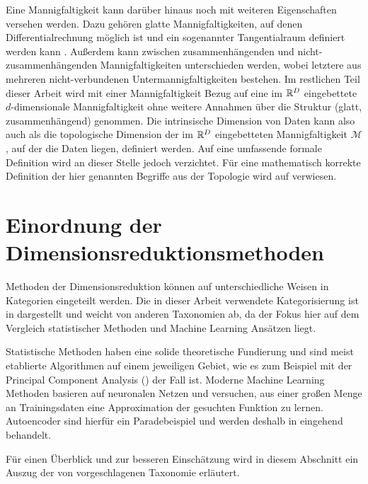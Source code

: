Eine Mannigfaltigkeit kann darüber hinaus noch mit weiteren Eigenschaften versehen werden. Dazu
gehören glatte Mannigfaltigkeiten, auf denen Differentialrechnung möglich ist und ein sogenannter
Tangentialraum definiert werden kann \parencite[50 -- 75]{Lee.2012}. Außerdem kann zwischen zusammenhängenden und nicht-zusammenhängenden
Mannigfaltigkeiten unterschieden werden, wobei letztere aus mehreren nicht-verbundenen
Untermannigfaltigkeiten bestehen. Im restlichen Teil dieser Arbeit wird mit einer Mannigfaltigkeit
Bezug auf eine im $\mathbb{R}^D$ eingebettete $d$-dimensionale Mannigfaltigkeit ohne weitere Annahmen
über die Struktur (glatt, zusammenhängend) genommen. Die intrinsische Dimension von Daten kann also
auch als die topologische Dimension der im $\mathbb{R}^D$ eingebetteten Mannigfaltigkeit $\mathcal{M}$,
auf der die Daten liegen, definiert werden. Auf eine umfassende formale Definition wird an dieser
Stelle jedoch verzichtet. Für eine mathematisch korrekte Definition der hier genannten Begriffe aus
der Topologie wird auf \textcites{Lee.2011}{Lee.2012} verwiesen.

\section{Einordnung der Dimensionsreduktionsmethoden}
\label{ch:Dimensionsreduktion:Ansaetze}
Methoden der Dimensionsreduktion können auf unterschiedliche Weisen in Kategorien eingeteilt werden. Die in dieser Arbeit verwendete Kategorisierung ist in  dargestellt und weicht von anderen Taxonomien ab, da der Fokus hier auf dem Vergleich statistischer Methoden und Machine Learning Ansätzen liegt.


Statistische Methoden haben eine solide theoretische Fundierung und sind meist etablierte
Algorithmen auf einem jeweiligen Gebiet, wie es zum Beispiel mit der Principal Component Analysis
() der Fall ist. Moderne Machine Learning Methoden
basieren auf neuronalen Netzen und versuchen, aus einer großen Menge an Trainingsdaten eine
Approximation der gesuchten Funktion zu lernen. Autoencoder sind hierfür ein Paradebeispiel und
werden deshalb in  eingehend behandelt.

Für einen Überblick und zur besseren Einschätzung wird in diesem Abschnitt ein Auszug der von
\textcite{vanderMaaten.2009} vorgeschlagenen Taxonomie
erläutert.


